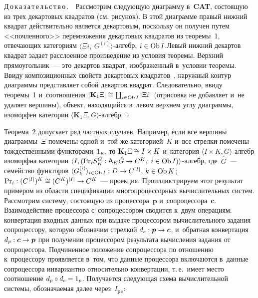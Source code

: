 \begin{multicols}{2}
  \noindent
  Д\,о\,к\,а\,з\,а\,т\,е\,л\,ь\,с\,т\,в\,о\,.\ \ Рассмотрим сле\-ду\-ющую диаграмму 
в~\textbf{CAT}, со\-сто\-ящую из трех декартовых квад\-ра\-тов (см. рисунок).
 В этой диаграмме правый нижний квад\-рат действительно является декартовым, 
поскольку он получен путем <<почленного>> перемножения декартовых 
квад\-ра\-тов из тео\-ре\-мы~1, от\-ве\-ча\-ющих категориям $\langle \Xi i,\ 
G^{(i)}\rangle$-ал\-гебр, $i\hm\in \mathrm{Ob}\,I$.\linebreak Левый нижний декартов 
квад\-рат задает рас\-сло\-ен\-ное произведение из условия тео\-ре\-мы. Верх\-ний 
прямоугольник~--- это декартов квад\-рат, изображенный в~условии тео\-ре\-мы. 
Ввиду композиционных свойств декартовых 
квад\-ра\-тов~\cite[предложение 11.10(1)]{9-kov}, на\-руж\-ный контур диаграммы 
{пред\-став\-ля\-ет} собой декартов квад\-рат. Следовательно, ввиду тео\-ре\-мы~1 
и~соотношения $\vert \mathbf{K}_1\Xi\vert \hm\cong \coprod_{i\in \mathrm{Ob}\,I} \vert \Xi i\vert$ 
(отрисовка не до\-бав\-ля\-ет и~не удаляет вершины), объект, находящийся в~левом 
верх\-нем углу диаграммы, изоморфен категории $\langle \mathbf{K}_1\Xi, 
G\rangle$-ал\-гебр.~$\square$
  
  Теорема~2 допускает ряд частных случаев. Например, если все вершины 
диаграммы~$\Xi$ помечены одной и~той же категорией~$K$ и~все стрелки 
помечены тождественными функторами~$1_K$, то $\mathbf{K}_1\Xi 
\hm\cong I\times K$ и~категория $\langle I\times K, G\rangle$-ал\-гебр 
изоморфна категории $\langle I, (\mathrm{Pr}_i S_K^{\hat{G}} : {\sf A}_K \hat{G} \hm\to 
C^K,\ i\hm\in \mathrm{Ob}\,I)\rangle$-ал\-гебр, где~$\hat{G}$~--- семейство 
функторов $\langle G^{(i)}_k\rangle_{i\in \mathrm{Ob}\,I} : D \hm\to C^{\vert 
I\vert}$, $k\hm \in \mathrm{Ob}\, K$; 
$\mathrm{Pr}_i: (C^{\vert I\vert})^K \hm \cong (C^K)^{\vert I\vert}\hm\to C^K$~--- проекция. 
Проиллюстрируем этот результат примером из области спецификации 
многопроцессорных вы\-чис\-ли\-тель\-ных сис\-тем. Рассмотрим сис\-те\-му,  
со\-сто\-ящую из процессора~$\boldsymbol{p}$ 
и~сопроцессора~$\boldsymbol{c}$. Взаимодействие процессора 
с~сопроцессором сводится к~двум операциям: конвертация входных данных 
при выдаче процессором вы\-чис\-ли\-тель\-но\-го задания сопроцессору, которую 
обозначим стрелкой $d_c : \boldsymbol{p}\hm\to \boldsymbol{c}$, и~обратная 
конвертация $d_p : \boldsymbol{c}\hm\to \boldsymbol{p}$ при получении 
процессором результата вы\-чис\-ле\-ния задания от сопроцессора. Подчиненное 
положение сопроцессора по отношению к~процессору проявляется в~том, что 
данные процессора включаются в~данные сопроцессора инвариантно 
относительно конвертации, т.\,е.\ имеет место соотношение $d_p\circ d_c\hm= 
1_p$. Получается следующая схема вы\-чис\-ли\-тель\-ной сис\-те\-мы, обозначаемая 
далее через~$I_{\boldsymbol{pc}}$:


\end{multicols}

